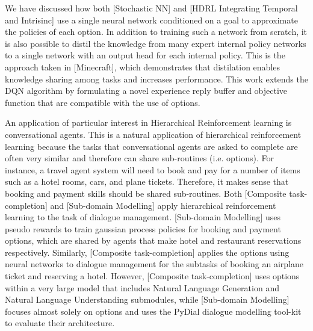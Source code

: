 We have discussed how both [Stochastic NN] and [HDRL Integrating Temporal and Intrisinc]
use a single neural network conditioned on a goal to approximate the policies of each option.
In addition to training such a network from scratch, it is also possible to distil
the knowledge from many expert internal policy networks to a single network with an
output head for each internal policy. This is the approach taken in [Minecraft], which
demonstrates that distilation enables knowledge sharing among tasks and increases performance.
This work extends the DQN algorithm by formulating a novel
experience reply buffer and objective function that are compatible with the use
of options.

An application of particular interest in Hierarchical Reinforcement learning
is conversational agents. This is a natural application of hierarchical
reinforcement learning because the tasks that conversational agents are asked
to complete are often very similar and therefore can share sub-routines
(i.e. options). For instance, a travel agent system will need to book
and pay for a number of items such as a hotel rooms, cars, and plane tickets.
Therefore, it makes sense that booking and payment skills should be shared sub-routines.
Both [Composite task-completion] and [Sub-domain Modelling] apply hierarchical
reinforcement learning to the task of dialogue management. [Sub-domain Modelling]
uses pseudo rewards to train gaussian process policies for booking and payment options,
which are shared by agents that make hotel and restaurant reservations respectively.
Similarly, [Composite task-completion] applies the options using neural networks
to dialogue management for the subtasks of booking an airplane ticket and reserving a hotel.
However, [Composite task-completion] uses options within a very large model that
includes Natural Language Generation and Natural Language Understanding
submodules, while [Sub-domain Modelling] focuses almost solely on options and
uses the PyDial dialogue modelling tool-kit to evaluate their architecture.



